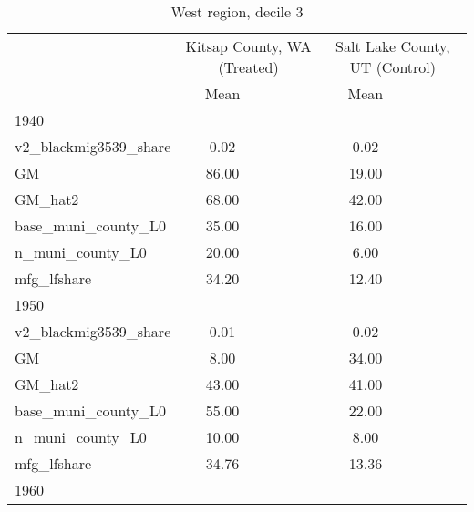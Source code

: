 \begin{table}[htbp]\centering
\def\sym#1{\ifmmode^{#1}\else\(^{#1}\)\fi}
\caption{West region, decile 3 \label{tab1}}
\begin{tabular}{l*{2}{ccc}}
\toprule
                    &\multicolumn{3}{c}{Kitsap County, WA (Treated)}&\multicolumn{3}{c}{Salt Lake County, UT (Control)}\\
                    &        Mean&            &            &        Mean&            &            \\
\midrule
1940                &            &            &            &            &            &            \\
v2\_blackmig3539\_share&        0.02&            &            &        0.02&            &            \\
GM                  &       86.00&            &            &       19.00&            &            \\
GM\_hat2             &       68.00&            &            &       42.00&            &            \\
base\_muni\_county\_L0 &       35.00&            &            &       16.00&            &            \\
n\_muni\_county\_L0    &       20.00&            &            &        6.00&            &            \\
mfg\_lfshare         &       34.20&            &            &       12.40&            &            \\
\midrule
1950                &            &            &            &            &            &            \\
v2\_blackmig3539\_share&        0.01&            &            &        0.02&            &            \\
GM                  &        8.00&            &            &       34.00&            &            \\
GM\_hat2             &       43.00&            &            &       41.00&            &            \\
base\_muni\_county\_L0 &       55.00&            &            &       22.00&            &            \\
n\_muni\_county\_L0    &       10.00&            &            &        8.00&            &            \\
mfg\_lfshare         &       34.76&            &            &       13.36&            &            \\
\midrule
1960                &            &            &            &            &            &            \\

\end{tabular}
\end{table}
